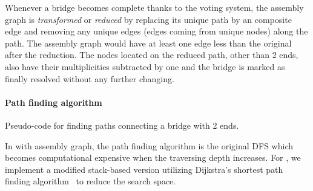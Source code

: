 Whenever a bridge becomes complete thanks to the voting system, the assembly graph is \emph{transformed} or \emph{reduced} by replacing its unique path by an composite edge and removing any unique edges (edges coming from unique nodes) along the path. The assembly graph would have at least one edge less than the original after the reduction. The nodes located on the reduced path, other than 2 ends, also have their multiplicities subtracted by one and the bridge is marked as finally resolved without any further changing. 
\paragraph{Path finding algorithm}

\begin{algorithm}[!hpt]
\DontPrintSemicolon
{}
\caption{Pseudo-code for finding paths connecting a bridge with 2 ends.}
\label{algo:findpath}
\end{algorithm}
In \npscarf{} with assembly graph, the path finding algorithm is the original DFS which becomes computational expensive when the traversing depth increases. For \npgraph{}, we implement a modified stack-based version utilizing Dijkstra's shortest path finding algorithm~\cite{Dijkstra1959} to reduce the search space.

